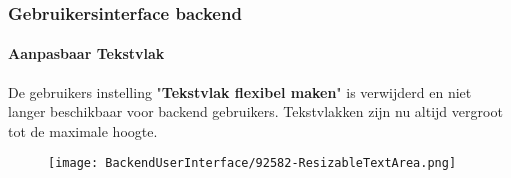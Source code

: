 %

\begin{frame}[fragile]
	\frametitle{Gebruikersinterface backend}
	\framesubtitle{Aanpasbaar Tekstvlak}

	De gebruikers instelling "\textbf{Tekstvlak flexibel maken}" is verwijderd en niet langer beschikbaar
	voor backend gebruikers.
	Tekstvlakken zijn nu altijd vergroot tot de maximale hoogte.

	\begin{figure}
		\texttt{[image: BackendUserInterface/92582-ResizableTextArea.png]}
	\end{figure}

\end{frame}

